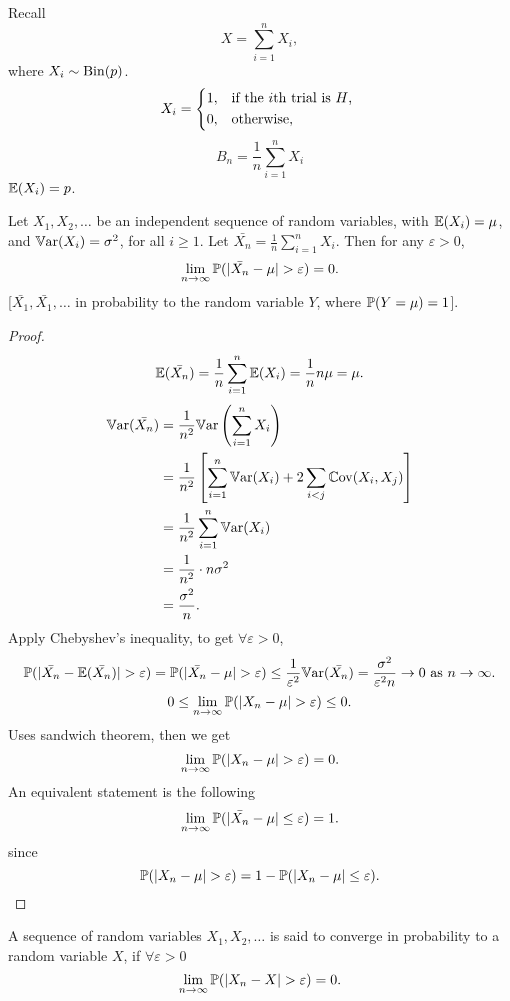 \documentclass[10pt, a4paper]{article}
\begin{document}
Recall
\[
X = \sum_{i = 1}^{n}X_i,
\]
where $X_i \sim \Bin(p)$.
\[
X_i = \begin{dcases*}
    1, & if the $i$th trial is $H$, \\
    0, & otherwise,
\end{dcases*}
\]
\[
B_n = \frac{1}{n}\sum_{i = 1}^{n}X_i
\]
$\E(X_i) = p$.
\begin{theorem}
    Let $X_1, X_2, \dotsc$ be an independent sequence of random variables,
    with $\E(X_i) = \mu$,
    and $\Var(X_i) = \sigma ^ 2$,
    for all $i \geq 1$.
    Let $\bar{X_n} = \frac{1}{n}\sum_{i = 1}^{n}X_i$.
    Then for any $\varepsilon > 0$,
    \[
    \lim_{n \rightarrow \infty}\P(|\bar{X_n} - \mu| > \varepsilon) = 0.
    \]
    [$\bar{X_1}, \bar{X_1}, \dotsc$ in probability to the random variable $Y$,
    where $\P(Y = \mu) = 1$].

    \begin{proof}
        \[
        \E(\bar{X_n}) = \frac{1}{n}\sum_{i = 1}^{n}\E(X_i) = \frac{1}{n}n\mu = \mu.
        \]
        \begin{align*}
            \Var(\bar{X_n}) &= \frac{1}{n ^ 2}\Var\left(\sum_{i = 1}^{n}X_i\right) \\
            &= \frac{1}{n ^ 2}\left[\sum_{i = 1}^{n}\Var(X_i) + 2 \sum_{i < j}\Cov(X_i, X_j)\right] \\
            &= \frac{1}{n ^ 2}\sum_{i = 1}^{n}\Var(X_i) \\
            &= \frac{1}{n ^ 2} \cdot n \sigma ^ 2 \\
            &= \frac{\sigma ^ 2}{n}.
        \end{align*}
        Apply Chebyshev's inequality,
        to get $\forall \varepsilon > 0$,
        \[
        \P(|\bar{X_n} - \E(\bar{X_n})| > \varepsilon) = \P(|\bar{X_n} - \mu| > \varepsilon) \leq \frac{1}{\varepsilon ^ 2}\Var(\bar{X_n}) = \frac{\sigma ^ 2}{\varepsilon ^ 2 n} \rightarrow 0 \text{ as } n \rightarrow \infty.
        \]
        \[
        0 \leq \lim_{n \rightarrow \infty}\P(|X_n - \mu| > \varepsilon) \leq 0.
        \]
        Uses sandwich theorem,
        then we get
        \[
        \lim_{n \rightarrow \infty}\P(|X_n - \mu| > \varepsilon) = 0.
        \]
        An equivalent statement is the following
        \[
        \lim_{n \rightarrow \infty}\P(|\bar{X_n} - \mu| \leq \varepsilon) = 1.
        \]
        since
        \[
        \P(|X_n - \mu| > \varepsilon) = 1 - \P(|X_n - \mu| \leq \varepsilon).
        \]
    \end{proof}
\end{theorem}

\begin{definition}
    A sequence of random variables $X_1, X_2, \dotsc$ is said to converge in probability to a random variable $X$,
    if $\forall \varepsilon > 0$
    \[
    \lim_{n \rightarrow \infty}\P(|X_n - X| > \varepsilon) = 0.
    \]
\end{definition}
\end{document}
